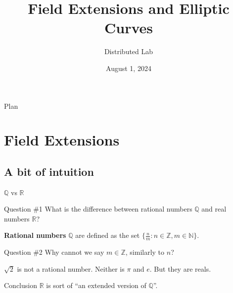 \documentclass{beamer}
\title[Field Extensions and Elliptic Curves]{\textbf{Field Extensions and Elliptic Curves}}
\author{Distributed Lab}
\date{August 1, 2024}
\begin{document}
    \frame {
      \titlepage
    }
  
    \begin{frame}{Plan}
      \tableofcontents
    \end{frame}

    \section{Field Extensions}

    \subsection{A bit of intuition}

    \begin{frame}{$\mathbb{Q}$ vs $\mathbb{R}$}
        \begin{alertblock}{Question \#1}
            What is the difference between rational numbers $\mathbb{Q}$ and real numbers $\mathbb{R}$?\pause
        \end{alertblock}

        \begin{definition}
            \textbf{Rational numbers} $\mathbb{Q}$ are defined as the set $\{\frac{n}{m}: n \in \mathbb{Z}, m \in \mathbb{N}\}$.\pause
        \end{definition}

        \begin{alertblock}{Question \#2}
            Why cannot we say $m \in \mathbb{Z}$, similarly to $n$?\pause
        \end{alertblock}

        \begin{theorem}
            $\sqrt{2}$ is not a rational number. Neither is $\pi$ and $e$. But they are reals.\pause
        \end{theorem}

        \begin{block}{Conclusion}
            $\mathbb{R}$ is sort of ``an extended version of $\mathbb{Q}$''.
        \end{block}
    \end{frame}
\end{document}
